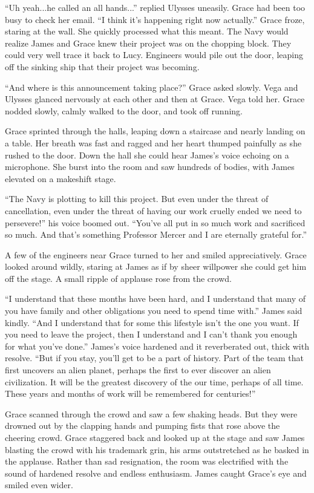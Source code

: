 \documentclass[12pt]{article} %
\begin{document}
``Uh yeah...he called an all hands...'' replied Ulysses uneasily. Grace had been too busy to check her email. ``I think it's happening right now actually.'' Grace froze, staring at the wall. She quickly processed what this meant. The Navy would realize James and Grace knew their project was on the chopping block. They could very well trace it back to Lucy. Engineers would pile out the door, leaping off the sinking ship that their project was becoming.

``And where is this announcement taking place?'' Grace asked slowly. Vega and Ulysses glanced nervously at each other and then at Grace. Vega told her. Grace nodded slowly, calmly walked to the door, and took off running.

Grace sprinted through the halls, leaping down a staircase and nearly landing on a table. Her breath was fast and ragged and her heart thumped painfully as she rushed to the door. Down the hall she could hear James's voice echoing on a microphone. She burst into the room and saw hundreds of bodies, with James elevated on a makeshift stage.

``The Navy is plotting to kill this project. But even under the threat of cancellation, even under the threat of having our work cruelly ended we need to persevere!'' his voice boomed out. ``You've all put in so much work and sacrificed so much. And that's something Professor Mercer and I are eternally grateful for.''

A few of the engineers near Grace turned to her and smiled appreciatively. Grace looked around wildly, staring at James as if by sheer willpower she could get him off the stage. A small ripple of applause rose from the crowd.

``I understand that these months have been hard, and I understand that many of you have family and other obligations you need to spend time with.'' James said kindly. ``And I understand that for some this lifestyle isn't the one you want. If you need to leave the project, then I understand and I can't thank you enough for what you've done.'' James's voice hardened and it reverberated out, thick with resolve. ``But if you stay, you'll get to be a part of history. Part of the team that first uncovers an alien planet, perhaps the first to ever discover an alien civilization. It will be the greatest discovery of the our time, perhaps of all time. These years and months of work will be remembered for centuries!''

Grace scanned through the crowd and saw a few shaking heads. But they were drowned out by the clapping hands and pumping fists that rose above the cheering crowd. Grace staggered back and looked up at the stage and saw James blasting the crowd with his trademark grin, his arms outstretched as he basked in the applause. Rather than sad resignation, the room was electrified with the sound of hardened resolve and endless enthusiasm.  James caught Grace's eye and smiled even wider.
\end{document}
